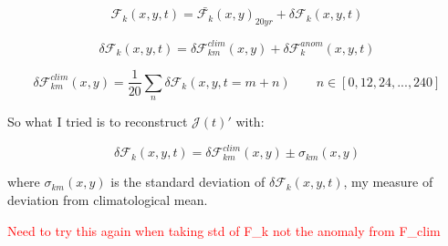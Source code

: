 \documentclass[a4paper,11pt]{article}
\newcommand{\red}[1]{\textcolor{red}{#1}}
\begin{document}
  \begin{equation}
	\mathcal{F}_k(x,y,t) = \bar{\mathcal{F}_k}(x,y)_{20yr} + \delta\mathcal{F}_k(x,y,t)
  \end{equation}

  \begin{equation}
	\delta\mathcal{F}_k(x,y,t) = \delta\mathcal{F}_{km}^{clim}(x,y) + \delta\mathcal{F}_{k}^{anom}(x,y,t)
  \end{equation}

  \begin{equation}
	\delta\mathcal{F}_{km}^{clim}(x,y) = \dfrac{1}{20}\sum_n\delta\mathcal{F}_k(x,y,t=m+n) \qquad n \in [0,12,24,...,240]
  \end{equation}

  So what I tried is to reconstruct $\mathcal{J}(t)'$ with:

  \begin{equation}
	\delta\mathcal{F}_k(x,y,t) = \delta\mathcal{F}_{km}^{clim}(x,y) \pm \sigma_{km}(x,y)	
  \end{equation}

  where $\sigma_{km}(x,y)$ is the standard deviation of $\delta\mathcal{F}_k(x,y,t)$, my measure of deviation from climatological mean. 

  \red{Need to try this again when taking std of F\_k not the anomaly from F\_clim}
\end{document}

